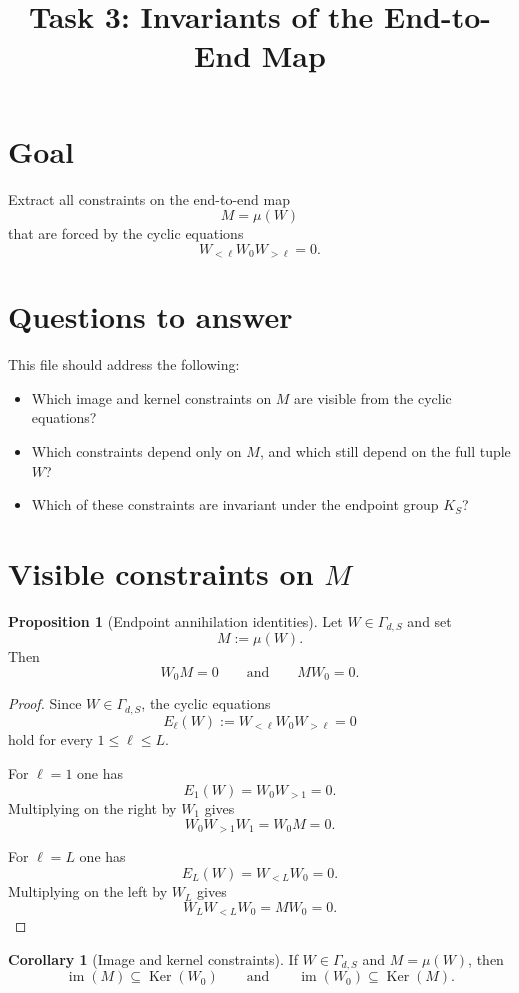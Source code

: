 \documentclass{article}
\title{Task 3: Invariants of the End-to-End Map}
\date{}
\newcommand{\im}{\operatorname{im}}
\newcommand{\Ker}{\operatorname{Ker}}
\theoremstyle{definition}
\newtheorem{proposition}[theorem]{Proposition}
\newtheorem{corollary}[theorem]{Corollary}
\begin{document}
\maketitle

\section{Goal}

Extract all constraints on the end-to-end map
\[
M=\mu(W)
\]
that are forced by the cyclic equations
\[
W_{<\ell}W_0W_{>\ell}=0.
\]

\section{Questions to answer}

This file should address the following:

\begin{itemize}
\item Which image and kernel constraints on $M$ are visible from the cyclic equations?
\item Which constraints depend only on $M$, and which still depend on the full tuple $W$?
\item Which of these constraints are invariant under the endpoint group $K_S$?
\end{itemize}

\section{Visible constraints on $M$}

\begin{proposition}[Endpoint annihilation identities]\label{prop:endpoint-annihilation}
Let $W\in \Gamma_{d,S}$ and set
\[
M:=\mu(W).
\]
Then
\[
W_0M=0
\qquad\text{and}\qquad
MW_0=0.
\]
\end{proposition}

\begin{proof}
Since $W\in \Gamma_{d,S}$, the cyclic equations
\[
E_\ell(W):=W_{<\ell}W_0W_{>\ell}=0
\]
hold for every $1\le \ell\le L$.

For $\ell=1$ one has
\[
E_1(W)=W_0W_{>1}=0.
\]
Multiplying on the right by $W_1$ gives
\[
W_0W_{>1}W_1=W_0M=0.
\]

For $\ell=L$ one has
\[
E_L(W)=W_{<L}W_0=0.
\]
Multiplying on the left by $W_L$ gives
\[
W_LW_{<L}W_0=MW_0=0.
\]
\end{proof}

\begin{corollary}[Image and kernel constraints]\label{cor:image-kernel-constraints}
If $W\in \Gamma_{d,S}$ and $M=\mu(W)$, then
\[
\im(M)\subseteq \Ker(W_0)
\qquad\text{and}\qquad
\im(W_0)\subseteq \Ker(M).
\]
\end{corollary}
\end{document}
